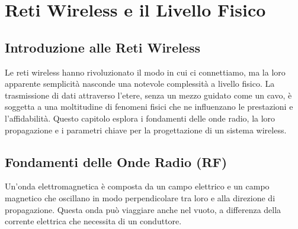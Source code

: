 \chapter{Reti Wireless e il Livello Fisico}
\section{Introduzione alle Reti Wireless}
Le reti wireless hanno rivoluzionato il modo in cui ci connettiamo, ma la loro apparente semplicità nasconde una notevole complessità a livello fisico. La trasmissione di dati attraverso l'etere, senza un mezzo guidato come un cavo, è soggetta a una moltitudine di fenomeni fisici che ne influenzano le prestazioni e l'affidabilità. Questo capitolo esplora i fondamenti delle onde radio, la loro propagazione e i parametri chiave per la progettazione di un sistema wireless.

\section{Fondamenti delle Onde Radio (RF)}


Un'onda elettromagnetica è composta da un campo elettrico e un campo magnetico che oscillano in modo perpendicolare tra loro e alla direzione di propagazione. Questa onda può viaggiare anche nel vuoto, a differenza della corrente elettrica che necessita di un conduttore.

